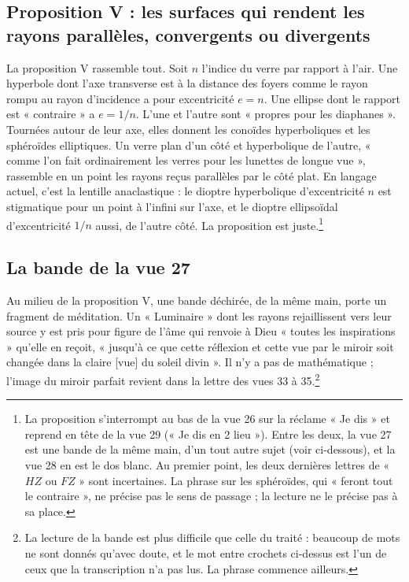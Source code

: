 \documentclass[11pt,a4paper]{article}
\begin{document}
\subsection*{Proposition V : les surfaces qui rendent les rayons parallèles, convergents ou divergents}

La proposition V rassemble tout. Soit \(n\) l'indice du verre par rapport à
l'air. Une hyperbole dont l'axe transverse est à la distance des foyers comme
le rayon rompu au rayon d'incidence a pour excentricité \(e=n\). Une ellipse
dont le rapport est « contraire » a \(e=1/n\). L'une et l'autre sont « propres
pour les diaphanes ». Tournées autour de leur axe, elles donnent les conoïdes
hyperboliques et les sphéroïdes elliptiques. Un verre plan d'un côté et
hyperbolique de l'autre, « comme l'on fait ordinairement les verres pour les
lunettes de longue vue », rassemble en un point les rayons reçus parallèles par
le côté plat. En langage actuel, c'est la lentille anaclastique : le dioptre
hyperbolique d'excentricité \(n\) est stigmatique pour un point à l'infini sur
l'axe, et le dioptre ellipsoïdal d'excentricité \(1/n\) aussi, de l'autre côté.
La proposition est juste.\footnote{La proposition s'interrompt au bas de la vue
26 sur la réclame « Je dis » et reprend en tête de la vue 29 (« Je dis en 2
lieu »). Entre les deux, la vue 27 est une bande de la même main, d'un tout
autre sujet (voir ci-dessous), et la vue 28 en est le dos blanc. Au premier
point, les deux dernières lettres de « \(HZ\) ou \(FZ\) » sont incertaines. La
phrase sur les sphéroïdes, qui « feront tout le contraire », ne précise pas le
sens de passage ; la lecture ne le précise pas à sa place.}

\subsection*{La bande de la vue 27}

Au milieu de la proposition V, une bande déchirée, de la même main, porte un
fragment de méditation. Un « Luminaire » dont les rayons rejaillissent vers
leur source y est pris pour figure de l'âme qui renvoie à Dieu « toutes les
inspirations » qu'elle en reçoit, « jusqu'à ce que cette réflexion et cette vue
par le miroir soit changée dans la claire [vue] du soleil divin ». Il n'y a pas
de mathématique ; l'image du miroir parfait revient dans la lettre des vues 33
à 35.\footnote{La lecture de la bande est plus difficile que celle du traité :
beaucoup de mots ne sont donnés qu'avec doute, et le mot entre crochets
ci-dessus est l'un de ceux que la transcription n'a pas lus. La phrase
commence ailleurs.}
\end{document}
